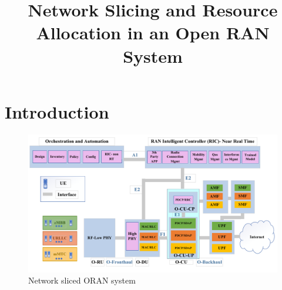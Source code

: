 \documentclass[conference]{IEEEtran}
\begin{document}
\title{Network Slicing and Resource Allocation in an Open RAN System \vspace{-.1cm}
}
%

\maketitle

\begin{abstract}

\end{abstract}
\section{Introduction} 

\begin{figure}
  \centering 
    \includegraphics[scale = 0.5]{finalDraw.pdf}
  \caption{Network sliced ORAN system}
  \label{fig:c11}
\end{figure}
\end{document}
